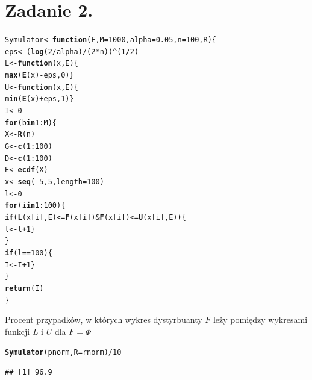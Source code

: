 \documentclass[12pt, a4paper]{article}\usepackage[]{graphicx}\usepackage[]{xcolor}
\makeatletter
\newcommand{\hlnum}[1]{\textcolor[rgb]{0.686,0.059,0.569}{#1}}%
\newcommand{\hlopt}[1]{\textcolor[rgb]{0,0,0}{#1}}%
\newcommand{\hlstd}[1]{\textcolor[rgb]{0.345,0.345,0.345}{#1}}%
\newcommand{\hlkwa}[1]{\textcolor[rgb]{0.161,0.373,0.58}{\textbf{#1}}}%
\newcommand{\hlkwb}[1]{\textcolor[rgb]{0.69,0.353,0.396}{#1}}%
\newcommand{\hlkwc}[1]{\textcolor[rgb]{0.333,0.667,0.333}{#1}}%
\newcommand{\hlkwd}[1]{\textcolor[rgb]{0.737,0.353,0.396}{\textbf{#1}}}%
\newenvironment{kframe}{%
 \def\at@end@of@kframe{}%
 \ifinner\ifhmode%
  \def\at@end@of@kframe{\end{minipage}}%
  \begin{minipage}{\columnwidth}%
 \fi\fi%
 \def\FrameCommand##1{\hskip\@totalleftmargin \hskip-\fboxsep
 \colorbox{shadecolor}{##1}\hskip-\fboxsep
     \hskip-\linewidth \hskip-\@totalleftmargin \hskip\columnwidth}%
 \MakeFramed {\advance\hsize-\width
   \@totalleftmargin\z@ \linewidth\hsize
   \@setminipage}}%
 {\par\unskip\endMakeFramed%
 \at@end@of@kframe}
\newenvironment{knitrout}{}{} %
\makeatother
\begin{document}
\section{Zadanie 2.}
\begin{knitrout}
\color{fgcolor}\begin{kframe}
\begin{alltt}
\hlstd{Symulator} \hlkwb{<-} \hlkwa{function}\hlstd{(}\hlkwc{F}\hlstd{,} \hlkwc{M}\hlstd{=}\hlnum{1000}\hlstd{,} \hlkwc{alpha}\hlstd{=}\hlnum{0.05}\hlstd{,} \hlkwc{n}\hlstd{=}\hlnum{100}\hlstd{,} \hlkwc{R}\hlstd{)\{}
  \hlstd{eps} \hlkwb{<-} \hlstd{(}\hlkwd{log}\hlstd{(}\hlnum{2}\hlopt{/}\hlstd{alpha)}\hlopt{/}\hlstd{(}\hlnum{2}\hlopt{*}\hlstd{n))}\hlopt{^}\hlstd{(}\hlnum{1}\hlopt{/}\hlnum{2}\hlstd{)}
  \hlstd{L} \hlkwb{<-} \hlkwa{function}\hlstd{(}\hlkwc{x}\hlstd{,} \hlkwc{E}\hlstd{)\{}
    \hlkwd{max}\hlstd{(}\hlkwd{E}\hlstd{(x)} \hlopt{-} \hlstd{eps,} \hlnum{0}\hlstd{)\}}
  \hlstd{U} \hlkwb{<-} \hlkwa{function}\hlstd{(}\hlkwc{x}\hlstd{,} \hlkwc{E}\hlstd{)\{}
    \hlkwd{min}\hlstd{(}\hlkwd{E}\hlstd{(x)} \hlopt{+} \hlstd{eps,} \hlnum{1}\hlstd{)\}}
  \hlstd{I} \hlkwb{<-} \hlnum{0}
  \hlkwa{for} \hlstd{(b} \hlkwa{in} \hlnum{1}\hlopt{:}\hlstd{M)\{}
    \hlstd{X} \hlkwb{<-} \hlkwd{R}\hlstd{(n)}
    \hlstd{G} \hlkwb{<-} \hlkwd{c}\hlstd{(}\hlnum{1}\hlopt{:}\hlnum{100}\hlstd{)}
    \hlstd{D} \hlkwb{<-} \hlkwd{c}\hlstd{(}\hlnum{1}\hlopt{:}\hlnum{100}\hlstd{)}
    \hlstd{E} \hlkwb{<-} \hlkwd{ecdf}\hlstd{(X)}
    \hlstd{x} \hlkwb{<-} \hlkwd{seq}\hlstd{(}\hlopt{-}\hlnum{5}\hlstd{,} \hlnum{5}\hlstd{,} \hlkwc{length}\hlstd{=}\hlnum{100}\hlstd{)}
    \hlstd{l} \hlkwb{<-} \hlnum{0}
    \hlkwa{for} \hlstd{(i} \hlkwa{in} \hlnum{1}\hlopt{:}\hlnum{100}\hlstd{)\{}
      \hlkwa{if} \hlstd{(}\hlkwd{L}\hlstd{(x[i], E)}\hlopt{<=}\hlkwd{F}\hlstd{(x[i])} \hlopt{&} \hlkwd{F}\hlstd{(x[i])} \hlopt{<=} \hlkwd{U}\hlstd{(x[i], E))\{}
        \hlstd{l} \hlkwb{<-} \hlstd{l} \hlopt{+}\hlnum{1}\hlstd{\}}
    \hlstd{\}}
    \hlkwa{if}\hlstd{(l}\hlopt{==}\hlnum{100}\hlstd{)\{}
      \hlstd{I} \hlkwb{<-} \hlstd{I} \hlopt{+}\hlnum{1}\hlstd{\}}
    \hlstd{\}}
  \hlkwd{return}\hlstd{(I)}
\hlstd{\}}
\end{alltt}
\end{kframe}
\end{knitrout}

Procent przypadków, w których wykres dystyrbuanty $F$ leży pomiędzy wykresami funkcji $L$ i $U$ dla $F = \Phi$
\begin{knitrout}
\color{fgcolor}\begin{kframe}
\begin{alltt}
\hlkwd{Symulator}\hlstd{(pnorm,} \hlkwc{R}\hlstd{=rnorm)}\hlopt{/}\hlnum{10}
\end{alltt}
\begin{verbatim}
## [1] 96.9
\end{verbatim}
\end{kframe}
\end{knitrout}
\end{document}
